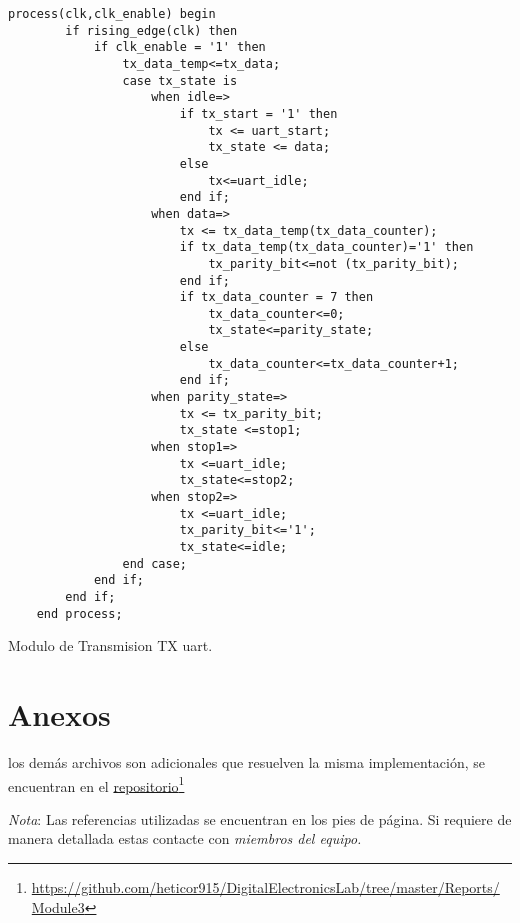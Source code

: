 \documentclass[paper=a4, fontsize=12pt]{article}        %
\newcommand\fnurl[2]{%
\href{#2}{#1}\footnote{\url{#2}}%
}
\numberwithin{equation}{section}                        %
\numberwithin{table}{section}                           %
\begin{document}
\begin{listing}[H]
    \begin{verbatim}
process(clk,clk_enable) begin
        if rising_edge(clk) then
            if clk_enable = '1' then
                tx_data_temp<=tx_data;
                case tx_state is
                    when idle=>
                        if tx_start = '1' then
                            tx <= uart_start;
                            tx_state <= data;
                        else
                            tx<=uart_idle;
                        end if;
                    when data=>
                        tx <= tx_data_temp(tx_data_counter);
                        if tx_data_temp(tx_data_counter)='1' then
                            tx_parity_bit<=not (tx_parity_bit);
                        end if;
                        if tx_data_counter = 7 then
                            tx_data_counter<=0;
                            tx_state<=parity_state;
                        else
                            tx_data_counter<=tx_data_counter+1;
                        end if;
                    when parity_state=>
                        tx <= tx_parity_bit;
                        tx_state <=stop1;
                    when stop1=>
                        tx <=uart_idle;
                        tx_state<=stop2;
                    when stop2=>
                        tx <=uart_idle;
                        tx_parity_bit<='1';
                        tx_state<=idle;
                end case;
            end if;
        end if;
    end process;
\end{verbatim}
\caption{Modulo de Transmision TX uart.}
    \label{tx}
\end{listing}

\section{Anexos}
los demás archivos son adicionales que resuelven la misma implementación, se encuentran en el \fnurl{repositorio}{https://github.com/heticor915/DigitalElectronicsLab/tree/master/Reports/Module3}
\textit{Nota}: Las referencias utilizadas se encuentran en los pies de página. Si requiere de manera detallada estas contacte con \emph{miembros del equipo.}
\end{document}
